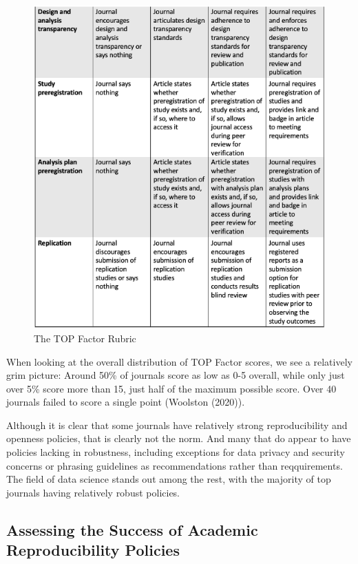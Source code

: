 \documentclass[12pt,twoside]{reedthesis}
\begin{document}
\begin{figure}

{\centering \includegraphics[width=1\linewidth]{figure/top-2} 

}

\caption{The TOP Factor Rubric}\label{fig:top-factor2}
\end{figure}
When looking at the overall distribution of TOP Factor scores, we see a relatively grim picture: Around 50\% of journals score as low as 0-5 overall, while only just over 5\% score more than 15, just half of the maximum possible score. Over 40 journals failed to score a single point (Woolston (2020)).

Although it is clear that some journals have relatively strong reproducibility and openness policies, that is clearly not the norm. And many that do appear to have policies lacking in robustness, including exceptions for data privacy and security concerns or phrasing guidelines as recommendations rather than reqquirements. The field of data science stands out among the rest, with the majority of top journals having relatively robust policies.

\hypertarget{assessing-the-success-of-academic-reproducibility-policies}{%
\subsection{Assessing the Success of Academic Reproducibility Policies}\label{assessing-the-success-of-academic-reproducibility-policies}}
\end{document}
